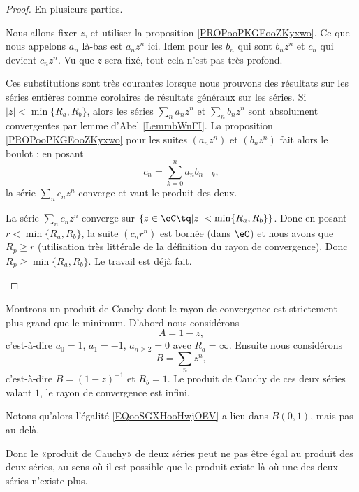 \begin{proof}
	En plusieurs parties.
	\begin{subproof}
		\spitem[Préambule]
		Nous allons fixer \( z\), et utiliser la proposition \ref{PROPooPKGEooZKyxwo}. Ce que nous appelons \( a_n\) là-bas est \( a_nz^n\) ici. Idem pour les \( b_n\) qui sont \( b_nz^n\) et \( c_n\) qui devient \( c_nz^n\). Vu que \( z\) sera fixé, tout cela n'est pas très profond.

		Ces substitutions sont très courantes lorsque nous prouvons des résultats sur les séries entières comme corolaires de résultats généraux sur les séries.
		Si \( | z |<\min\{ R_a,R_b \}\), alors les séries \( \sum_na_nz^n\) et \( \sum_nb_nz^n\) sont absolument convergentes par lemme d'Abel \ref{LemmbWnFI}. La proposition \ref{PROPooPKGEooZKyxwo} pour les suites \( (a_nz^n)\) et \( (b_nz^n)\) fait alors le boulot : en posant
		\begin{equation}
			c_n=\sum_{k=0}^na_nb_{n-k},
		\end{equation}
		la série \( \sum_nc_nz^n\) converge et vaut le produit des deux.

		La série \( \sum_nc_nz^n\) converge sur \( \{ z\in \eC\tq | z |<\min\{ R_a,R_b \} \}\). Donc en posant \( r<\min\{ R_a,R_b \}\), la suite \( (c_nr^n)\) est bornée (dans \( \eC\)) et nous avons que \( R_p\geq r\) (utilisation très littérale de la définition du rayon de convergence). Donc \( R_p\geq\min \{ R_a,R_b \}\).
		Le travail est déjà fait.
	\end{subproof}
\end{proof}

\begin{example}
	Montrons un produit de Cauchy dont le rayon de convergence est strictement plus grand que le minimum. D'abord nous considérons
	\begin{equation}
		A=1-z,
	\end{equation}
	c'est-à-dire \( a_0=1\), \( a_1=-1\), \( a_{n\geq 2}=0\) avec \( R_a=\infty\). Ensuite nous considérons
	\begin{equation}
		B=\sum_nz^n,
	\end{equation}
	c'est-à-dire \( B=(1-z)^{-1}\) et \( R_b=1\). Le produit de Cauchy de ces deux séries valant \( 1\), le rayon de convergence est infini.

	Notons qu'alors l'égalité \eqref{EQooSGXHooHwjOEV} a lieu dans \( B(0,1)\), mais pas au-delà.

	Donc le «produit de Cauchy» de deux séries peut ne pas être égal au produit des deux séries, au sens où il est possible que le produit existe là où une des deux séries n'existe plus.
\end{example}


